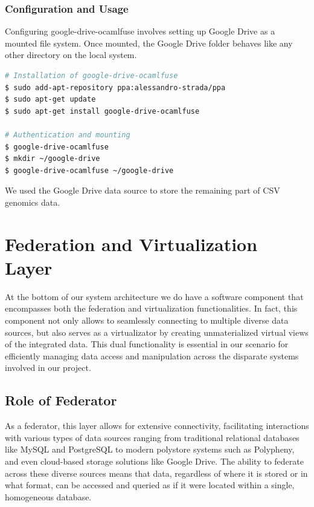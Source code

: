 \subsubsection{Configuration and Usage}
Configuring google-drive-ocamlfuse involves setting up Google Drive as a mounted file system. Once mounted, the Google Drive folder behaves like any other directory on the local system.
\begin{lstlisting}[language=bash, caption={google-drive-ocamlfuse Tool installation procedure}, label={lst:ocamlfuse}]
# Installation of google-drive-ocamlfuse
$ sudo add-apt-repository ppa:alessandro-strada/ppa
$ sudo apt-get update
$ sudo apt-get install google-drive-ocamlfuse

# Authentication and mounting
$ google-drive-ocamlfuse
$ mkdir ~/google-drive
$ google-drive-ocamlfuse ~/google-drive
\end{lstlisting}
We used the Google Drive data source to store the remaining part of \ac{CSV} genomics data.


\section{Federation and Virtualization Layer}
At the bottom of our system architecture we do have a software component that encompasses both the federation and virtualization functionalities. In fact, this component not only allows to seamlessly connecting to multiple diverse data sources, but also serves as a virtualizator by creating unmaterialized virtual views of the integrated data. This dual functionality is essential in our scenario for efficiently managing data access and manipulation across the disparate systems involved in our project.
\subsection{Role of Federator}
As a federator, this layer allows for extensive connectivity, facilitating interactions with various types of data sources ranging from traditional relational databases like MySQL and PostgreSQL to modern polystore systems such as Polypheny, and even cloud-based storage solutions like Google Drive. The ability to federate across these diverse sources means that data, regardless of where it is stored or in what format, can be accessed and queried as if it were located within a single, homogeneous database.

